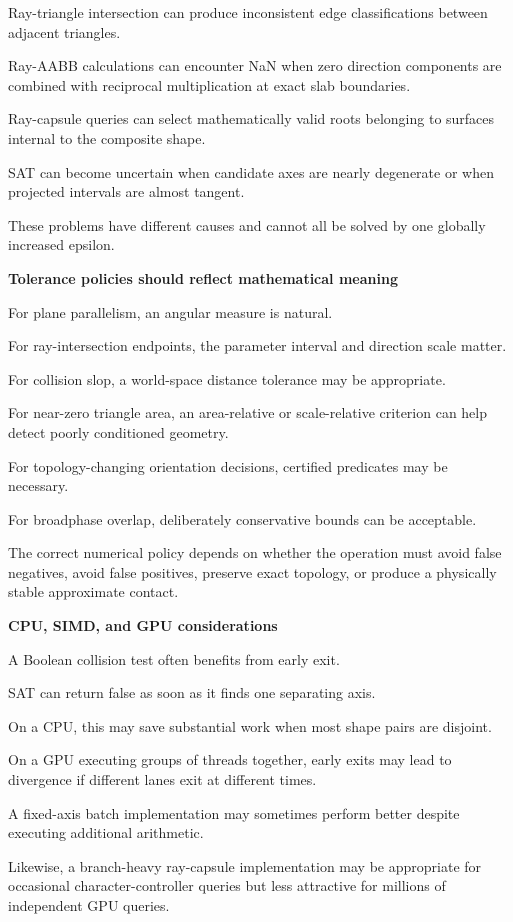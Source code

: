 Ray-triangle intersection can produce inconsistent edge classifications between adjacent triangles.

Ray-AABB calculations can encounter NaN when zero direction components are combined with reciprocal multiplication at exact slab boundaries.

Ray-capsule queries can select mathematically valid roots belonging to surfaces internal to the composite shape.

SAT can become uncertain when candidate axes are nearly degenerate or when projected intervals are almost tangent.

These problems have different causes and cannot all be solved by one globally increased epsilon.

\textbf{Tolerance policies should reflect mathematical meaning}

For plane parallelism, an angular measure is natural.

For ray-intersection endpoints, the parameter interval and direction scale matter.

For collision slop, a world-space distance tolerance may be appropriate.

For near-zero triangle area, an area-relative or scale-relative criterion can help detect poorly conditioned geometry.

For topology-changing orientation decisions, certified predicates may be necessary.

For broadphase overlap, deliberately conservative bounds can be acceptable.

The correct numerical policy depends on whether the operation must avoid false negatives, avoid false positives, preserve exact topology, or produce a physically stable approximate contact.

\textbf{CPU, SIMD, and GPU considerations}

A Boolean collision test often benefits from early exit.

SAT can return false as soon as it finds one separating axis.

On a CPU, this may save substantial work when most shape pairs are disjoint.

On a GPU executing groups of threads together, early exits may lead to divergence if different lanes exit at different times.

A fixed-axis batch implementation may sometimes perform better despite executing additional arithmetic.

Likewise, a branch-heavy ray-capsule implementation may be appropriate for occasional character-controller queries but less attractive for millions of independent GPU queries.

